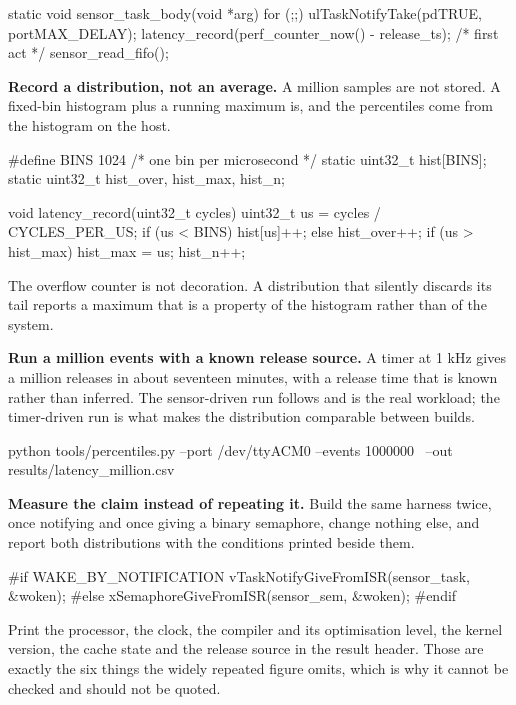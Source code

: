 \begin{steps}
\begin{ccode}
static void sensor_task_body(void *arg)
{
    for (;;) {
        ulTaskNotifyTake(pdTRUE, portMAX_DELAY);
        latency_record(perf_counter_now() - release_ts);   /* first act */
        sensor_read_fifo();
    }
}
\end{ccode}

\item \textbf{Record a distribution, not an average.} A million samples are not
stored. A fixed-bin histogram plus a running maximum is, and the percentiles
come from the histogram on the host.
\begin{ccode}
#define BINS 1024                       /* one bin per microsecond */
static uint32_t hist[BINS];
static uint32_t hist_over, hist_max, hist_n;

void latency_record(uint32_t cycles)
{
    uint32_t us = cycles / CYCLES_PER_US;
    if (us < BINS) hist[us]++; else hist_over++;
    if (us > hist_max) hist_max = us;
    hist_n++;
}
\end{ccode}
The overflow counter is not decoration. A distribution that silently discards
its tail reports a maximum that is a property of the histogram rather than of
the system.

\item \textbf{Run a million events with a known release source.} A timer at
1 kHz gives a million releases in about seventeen minutes, with a release time
that is known rather than inferred. The sensor-driven run follows and is the
real workload; the timer-driven run is what makes the distribution comparable
between builds.
\begin{shellcode}
python tools/percentiles.py --port /dev/ttyACM0 --events 1000000 \
  --out results/latency_million.csv
\end{shellcode}

\item \textbf{Measure the claim instead of repeating it.} Build the same
harness twice, once notifying and once giving a binary semaphore, change
nothing else, and report both distributions with the conditions printed beside
them.
\begin{ccode}
#if WAKE_BY_NOTIFICATION
    vTaskNotifyGiveFromISR(sensor_task, &woken);
#else
    xSemaphoreGiveFromISR(sensor_sem, &woken);
#endif
\end{ccode}
Print the processor, the clock, the compiler and its optimisation level, the
kernel version, the cache state and the release source in the result header.
Those are exactly the six things the widely repeated figure omits, which is why
it cannot be checked and should not be quoted.


\end{steps}
